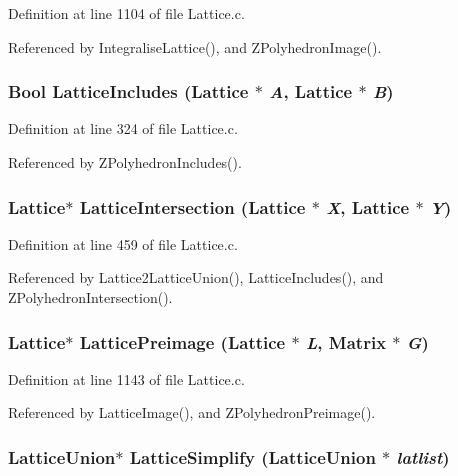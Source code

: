 Definition at line 1104 of file Lattice.c.

Referenced by Integralise\-Lattice(), and ZPolyhedron\-Image().

\subsubsection{\setlength{\rightskip}{0pt plus 5cm}Bool Lattice\-Includes (Lattice $\ast$ {\em A}, Lattice $\ast$ {\em B})}\label{Lattice_8c_a11}




Definition at line 324 of file Lattice.c.

Referenced by ZPolyhedron\-Includes().

\subsubsection{\setlength{\rightskip}{0pt plus 5cm}Lattice$\ast$ Lattice\-Intersection (Lattice $\ast$ {\em X}, Lattice $\ast$ {\em Y})}\label{Lattice_8c_a16}




Definition at line 459 of file Lattice.c.

Referenced by Lattice2Lattice\-Union(), Lattice\-Includes(), and ZPolyhedron\-Intersection().

\subsubsection{\setlength{\rightskip}{0pt plus 5cm}Lattice$\ast$ Lattice\-Preimage (Lattice $\ast$ {\em L}, Matrix $\ast$ {\em G})}\label{Lattice_8c_a25}




Definition at line 1143 of file Lattice.c.

Referenced by Lattice\-Image(), and ZPolyhedron\-Preimage().

\subsubsection{\setlength{\rightskip}{0pt plus 5cm}Lattice\-Union$\ast$ Lattice\-Simplify (Lattice\-Union $\ast$ {\em latlist})}\label{Lattice_8c_a36}




